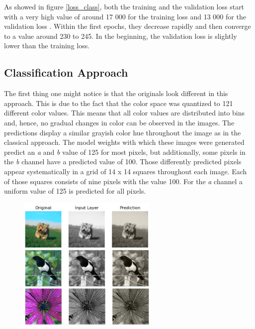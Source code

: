 \documentclass[12pt,letterpaper]{article}
\begin{document}
As showed in figure \ref{loss_class},  both the training and the validation loss start with a very high value of around 17 000 for the training loss and 13 000 for the validation loss . Within the first epochs, they decrease rapidly and then converge to a value around 230 to 245. In the beginning, the validation loss is slightly lower than the training loss.

\newpage
\subsection{Classification Approach}
The first thing one might notice is that the originals look different in this approach. This is due to the fact that the color space was quantized to 121 different color values. This means that all color values are distributed into bins and, hence, no gradual changes in color can be observed in the images. The predictions display a similar grayish color hue throughout the image as in the classical approach. The model weights with which these images were generated predict an \emph{a} and \emph{b} value of 125 for most pixels, but additionally, some pixels in the \emph{b} channel have a predicted value of 100. Those differently predicted pixels appear systematically in a grid of 14 x 14 squares throughout each image. Each of those squares consists of nine pixels with the value 100. For the \emph{a} channel a uniform value of 125 is predicted for all pixels.
\begin{figure}[hbt]
	\centering
	\includegraphics[width=0.6\textwidth]{classific_predict.png}
	\caption{}
	\label{dots}
\end{figure}
\end{document}
